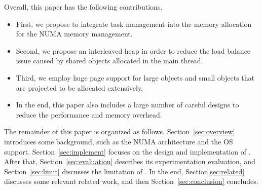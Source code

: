 Overall, this paper has the following contributions. 

\begin{itemize}
\item First, we propose to integrate task management into the memory allocation for the NUMA memory management. 
\item Second, we propose an interleaved heap in order to reduce the load balance issue caused by shared objects allocated in the main thread. 
\item Third, we employ huge page support for large objects and small objects that are projected to be allocated extensively. 
\item In the end, this paper also includes a large number of careful designs to reduce the performance and memory overhead. 
\end{itemize}

The remainder of this paper is organized as follows. Section~\ref{sec:overview} introduces some background, such as the NUMA architecture and the OS support. Section~\ref{sec:implement} focuses on the design and implementation of \NM{}. After that, Section~\ref{sec:evaluation} describes its experimentation evaluation, and Section~\ref{sec:limit} discusses the limitation of \NM{}. In the end, Section\ref{sec:related} discusses some relevant related work, and then Section~\ref{sec:conclusion} concludes. 

